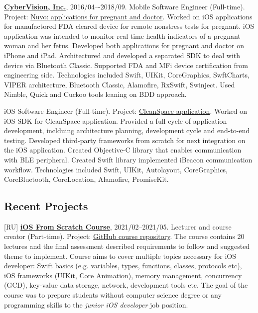 \documentclass{hamsternik.cv}
\begin{document}
\vspace*{14px}

\textbf{\href{https://www.cybervisiontech.com}{CyberVision, Inc.}}, 2016/04–-2018/09.
\newline Mobile Software Engineer (Full-time). Project: \href{https://www.nuvocares.com/solutions}{Nuvo: applications for pregnant and doctor}.
\newline Worked on iOS applications for manufactored FDA cleared device for remote nonstress tests for pregnant. 
iOS application was intended to monitor real-time health indicators of a pregnant woman and her fetus. 
Developed both applications for pregnant and doctor on iPhone and iPad.
Architectured and developed a separated SDK to deal with device via Bluetooth Classic.
Supported FDA and MFi device certification from engineering side.
\newline Technologies included Swift, UIKit, CoreGraphics, SwftCharts, VIPER architecture, 
Bluetooth Classic, Alamofire, RxSwift, Swinject. Used Nimble, Quick and Cuckoo tools leaning on BDD approach.

\vspace*{7px}

iOS Software Engineer (Full-time). Project: \href{https://www.sensynehealth.com/cleanspace}{CleanSpace application}.
\newline Worked on iOS SDK for CleanSpace application. 
Provided a full cycle of application development, inclduing architecture planning, 
development cycle and end-to-end testing.
Developed third-party frameworks from scratch for next integration on the iOS application.
Created Objective-C library that enables communication with BLE peripheral.
Created Swift library implemented iBeacon communication workflow. 
\newline Technologies included Swift, UIKit, Autolayout, CoreGraphics, CoreBluetooth, CoreLocation, Alamofire, PromiseKit.


\subsection*{Recent Projects}

[RU] \textbf{\href{https://robotdreams.cc/course/ios-razrabotka-prilozheniy-s-0}{iOS From Scratch Course}}, 2021/02--2021/05.
\newline Lecturer and course creator (Part-time). Project: \href{https://github.com/hamsternik/robotdreams-ios-course}{GitHub course repository}.
\newline The course contains 20 lectures and the final assessment described requirements to follow and suggested theme to implement.
Course aims to cover multiple topics necessary for iOS developer:
Swift basics (e.g. variables, types, functions, classes, protocols etc), iOS frameworks (UIKit, Core Animation), 
memory management, concurrency (GCD), key-value data storage, network, development tools etc.
\newline The goal of the course was to prepare students without computer science degree or any programming skills to the \textit{junior iOS developer} job position.
\end{document}
